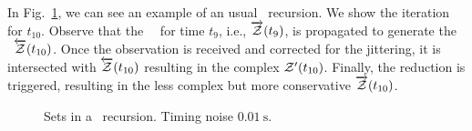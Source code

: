 \documentclass{ifacconf}
\begin{document}


%
In Fig.~\ref{fig:czs_prior_posterior}, we can see an example of an usual \czesmf\ recursion.
We show the iteration for $t_{10}$.
Observe that the \aposteriori\ \cz\ for time $t_9$, i.e., $\overrightarrow{\mathcal{Z}}(t_{9})$, is propagated to generate the \apriori\ $\overleftarrow{\mathcal{Z}}(t_{10})$.
Once the observation is received and corrected for the jittering, it is intersected with $\overleftarrow{\mathcal{Z}}(t_{10})$ resulting in the complex $\mathcal{Z}'(t_{10})$.
Finally, the reduction is triggered, resulting in the less complex but more conservative $\overrightarrow{\mathcal{Z}}(t_{10})$.
\begin{figure}[hb]

  \centering
  \vspace{-.25cm}
  \caption{Sets in a \czesmf\ recursion. Timing noise $\qty{0.01}{\second}$.%
  }
  \label{fig:czs_prior_posterior}
\end{figure}
\end{document}
